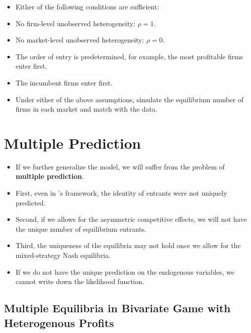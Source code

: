 \documentclass[
]{book}
\providecommand{\tightlist}{%
  \setlength{\itemsep}{0pt}\setlength{\parskip}{0pt}}
\begin{document}
\begin{itemize}
\tightlist
\item
  Either of the following conditions are sufficient:
\item
  No firm-level unobserved heterogeneity: \(\rho = 1\).
\item
  No market-level unobserved heterogeneity: \(\rho = 0\).
\item
  The order of entry is predetermined, for example, the most profitable firms enter first.
\item
  The incumbent firms enter first.
\item
  Under either of the above assumptions, simulate the equilibrium number of firms in each market and match with the data.
\end{itemize}

\hypertarget{multiple-prediction}{%
\section{Multiple Prediction}\label{multiple-prediction}}

\begin{itemize}
\tightlist
\item
  If we further generalize the model, we will suffer from the problem of \textbf{multiple prediction}.
\item
  First, even in \citet{berryEstimationModelEntry1992}'s framework, the identity of entrants were not uniquely predicted.
\item
  Second, if we allows for the asymmetric competitive effects, we will not have the unique number of equilibrium entrants.
\item
  Third, the uniqueness of the equilibria may not hold once we allow for the mixed-strategy Nash equilibria.
\item
  If we do not have the unique prediction on the endogenous variables, we cannot write down the likelihood function.
\end{itemize}

\hypertarget{multiple-equilibria-in-bivariate-game-with-heterogenous-profits}{%
\subsection{Multiple Equilibria in Bivariate Game with Heterogenous Profits}\label{multiple-equilibria-in-bivariate-game-with-heterogenous-profits}}
\end{document}
